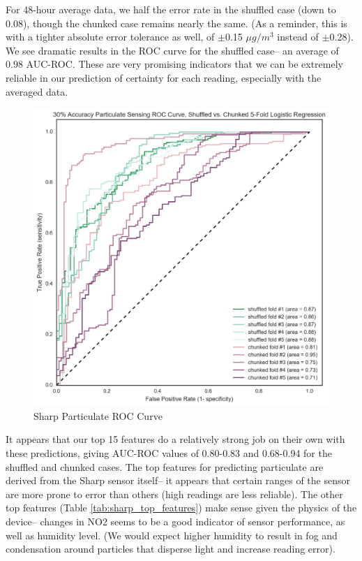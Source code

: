 For 48-hour average data, we half the error rate in the shuffled case (down to 0.08), though the chunked case remains nearly the same.  (As a reminder, this is with a tighter absolute error tolerance as well, of $\pm$0.15 $\mu g/m^3$ instead of $\pm$0.28). We see dramatic results in the ROC curve for the shuffled case-- an average of 0.98 AUC-ROC.  These are very promising indicators that we can be extremely reliable in our prediction of certainty for each reading, especially with the averaged data.

\begin{figure}[htb]
 	\includegraphics[width=\textwidth]{figs/sharp_goals_30_roc}               
 	 \caption{Sharp Particulate ROC Curve}
  	\label{fig:sharp_30_roc}
\end{figure}

It appears that our top 15 features do a relatively strong job on their own with these predictions, giving AUC-ROC values of 0.80-0.83 and 0.68-0.94 for the shuffled and chunked cases.  The top features for predicting particulate are derived from the Sharp sensor itself-- it appears that certain ranges of the sensor are more prone to error than others (high readings are less reliable).  The other top features (Table \ref{tab:sharp_top_features}) make sense given the physics of the device-- changes in NO2 seems to be a good indicator of sensor performance, as well as humidity level. (We would expect higher humidity to result in fog and condensation around particles that disperse light and increase reading error).  

